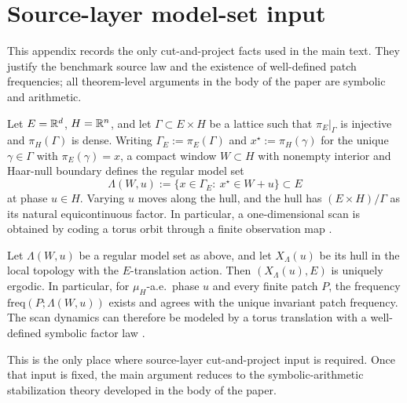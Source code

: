 \section{Source-layer model-set input}\label{sec:superspace}

This appendix records the only cut-and-project facts used in the main text. They justify the benchmark source law and the existence of well-defined patch frequencies; all theorem-level arguments in the body of the paper are symbolic and arithmetic.

Let $E=\mathbb{R}^d$, $H=\mathbb{R}^n$, and let $\Gamma\subset E\times H$ be a lattice such that $\pi_E|_{\Gamma}$ is injective and $\pi_H(\Gamma)$ is dense. Writing $\Gamma_E:=\pi_E(\Gamma)$ and $x^\star:=\pi_H(\gamma)$ for the unique $\gamma\in\Gamma$ with $\pi_E(\gamma)=x$, a compact window $W\subset H$ with nonempty interior and Haar-null boundary defines the regular model set
\[
\Lambda(W,u):=\{x\in\Gamma_E:\ x^\star\in W+u\}\subset E
\]
at phase $u\in H$. Varying $u$ moves along the hull, and the hull has $(E\times H)/\Gamma$ as its natural equicontinuous factor. In particular, a one-dimensional scan is obtained by coding a torus orbit through a finite observation map \cite{Moody2000,BaakeGrimm2013}.

\begin{proposition}\label{prop:unique-ergodicity}
Let $\Lambda(W,u)$ be a regular model set as above, and let $X_{\Lambda}(u)$ be its hull in the local topology with the $E$-translation action. Then $(X_{\Lambda}(u),E)$ is uniquely ergodic. In particular, for $\mu_H$-a.e.\ phase $u$ and every finite patch $P$, the frequency $\mathrm{freq}(P;\Lambda(W,u))$ exists and agrees with the unique invariant patch frequency. The scan dynamics can therefore be modeled by a torus translation with a well-defined symbolic factor law \cite{Moody2000,BaakeGrimm2013}.
\end{proposition}

This is the only place where source-layer cut-and-project input is required. Once that input is fixed, the main argument reduces to the symbolic-arithmetic stabilization theory developed in the body of the paper.
